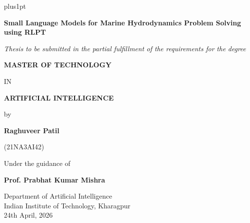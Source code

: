 \documentclass[12pt]{report}
\begin{document}
 \baselineskip=18pt plus1pt
 \setcounter{secnumdepth}{3}
 \setcounter{tocdepth}{3}
 
\begin{titlepage}
\begin{center}

\vspace*{1cm}

{\Large \textbf{Small Language Models for Marine Hydrodynamics Problem Solving using RLPT}}

\vspace{1.5cm}

{\large \textit{Thesis to be submitted in the partial fulfillment of the requirements for the degree}}

\vspace{0.8cm}

{\large \textbf{MASTER OF TECHNOLOGY}}

\vspace{0.3cm}

{\large IN}

\vspace{0.3cm}

{\large \textbf{ARTIFICIAL INTELLIGENCE}}

\vspace{0.8cm}

{\large by}

\vspace{0.5cm}

{\Large \textbf{Raghuveer Patil}}

{\large (21NA3AI42)}

\vspace{1.0cm}

{\large Under the guidance of}

\vspace{0.5cm}

{\Large \textbf{Prof. Prabhat Kumar Mishra}}

\vspace{1.5cm}

\vspace{1.0cm}

{\large Department of Artificial Intelligence}\\
{\large Indian Institute of Technology, Kharagpur}\\
{\large 24th April, 2026}

\end{center}
\end{titlepage}
\end{document}
